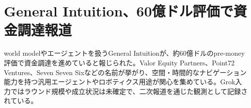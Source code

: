\section{General Intuition、60億ドル評価で資金調達報道}
world modelやエージェントを扱うGeneral Intuitionが、約60億ドルのpre-money評価で資金調達を進めていると報じられた。Valor Equity Partners、Point72 Ventures、Seven Seven Sixなどの名前が挙がり、空間・時間的なナビゲーション能力を持つ汎用エージェントやロボティクス用途が関心を集めている。Grok入力ではラウンド規模や成立状況は未確定で、二次報道を通じた観測として記録されている。
